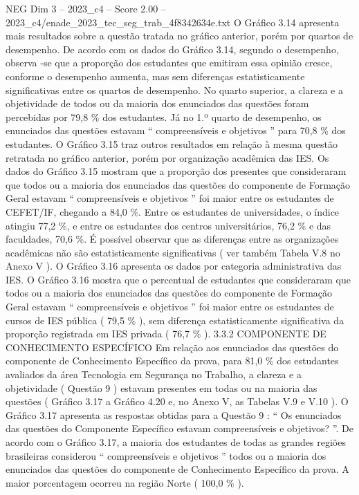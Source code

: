 \begin{textsample}{NEG Dim 3 – 2023\_c4 – Score 2.00 – 2023\_c4/enade\_2023\_tec\_seg\_trab\_4f8342634e.txt}
O Gráfico 3.14 apresenta mais resultados sobre a questão tratada no gráfico anterior, porém por quartos de desempenho.
De acordo com os dados do Gráfico 3.14, segundo o desempenho, observa -se que a proporção dos estudantes que emitiram essa opinião cresce, conforme o desempenho aumenta, mas sem diferenças estatisticamente significativas entre os quartos de desempenho.
No quarto superior, a clareza e a objetividade de todos ou da maioria dos enunciados das questões foram percebidas por 79,8 \% dos estudantes.
Já no 1.º quarto de desempenho, os enunciados das questões estavam “ compreensíveis e objetivos ” para 70,8 \% dos estudantes.
O Gráfico 3.15 traz outros resultados em relação à mesma questão retratada no gráfico anterior, porém por organização acadêmica das IES.
Os dados do Gráfico 3.15 mostram que a proporção dos presentes que consideraram que todos ou a maioria dos enunciados das questões do componente de Formação Geral estavam “ compreensíveis e objetivos ” foi maior entre os estudantes de CEFET/IF, chegando a 84,0 \%.
Entre os estudantes de universidades, o índice atingiu 77,2 \%, e entre os estudantes dos centros universitários, 76,2 \% e das faculdades, 70,6 \%.
É possível observar que as diferenças entre as organizações acadêmicas não são estatisticamente significativas ( ver também Tabela V.8 no Anexo V ).
O Gráfico 3.16 apresenta os dados por categoria administrativa das IES.
O Gráfico 3.16 mostra que o percentual de estudantes que consideraram que todos ou a maioria dos enunciados das questões do componente de Formação Geral estavam “ compreensíveis e objetivos ” foi maior entre os estudantes de cursos de IES pública ( 79,5 \% ), sem diferença estatisticamente significativa da proporção registrada em IES privada ( 76,7 \% ). 3.3.2 COMPONENTE DE CONHECIMENTO ESPECÍFICO Em relação aos enunciados das questões do componente de Conhecimento Específico da prova, para 81,0 \% dos estudantes avaliados da área Tecnologia em Segurança no Trabalho, a clareza e a objetividade ( Questão 9 ) estavam presentes em todas ou na maioria das questões ( Gráfico 3.17 a Gráfico 4.20 e, no Anexo V, as Tabelas V.9 e V.10 ).
O Gráfico 3.17 apresenta as respostas obtidas para a Questão 9 : “ Os enunciados das questões do Componente Específico estavam compreensíveis e objetivos? ”.
De acordo com o Gráfico 3.17, a maioria dos estudantes de todas as grandes regiões brasileiras considerou “ compreensíveis e objetivos ” todos ou a maioria dos enunciados das questões do componente de Conhecimento Específico da prova.
A maior porcentagem ocorreu na região Norte ( 100,0 \% ).

\end{textsample}

